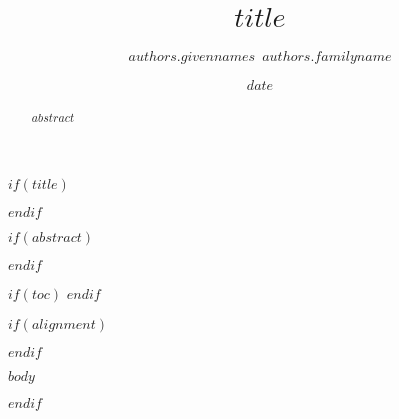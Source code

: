 \documentclass[11pt]{scrartcl}
\title{$title$}
\date{$date$}
\author[$for(authors.affiliations)$$authors.affiliations$$sep$,$endfor$]{$authors.givennames$~$authors.familyname$}
\affil[$affiliations.index$]{$affiliations.name$}
\begin{document}
$if(title)$
\maketitle
$endif$

$if(abstract)$
\begin{abstract}
$abstract$
\end{abstract}
$endif$

$if(toc)$
\tableofcontents
$endif$


$if(alignment)$
\begin{$alignment$}
$endif$

\linenumbers

$body$

\end{$alignment$}
$endif$
\end{document}
